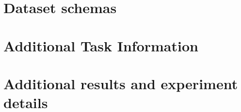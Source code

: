 \documentclass{article} %
\begin{document}
\section{Dataset schemas} \label{sec:dataset_schemas}




\newpage

\section{Additional Task Information} \label{sec:task_info}




\newpage

\section{Additional results and experiment details} \label{sec:appendix_task_results}











\end{document}
